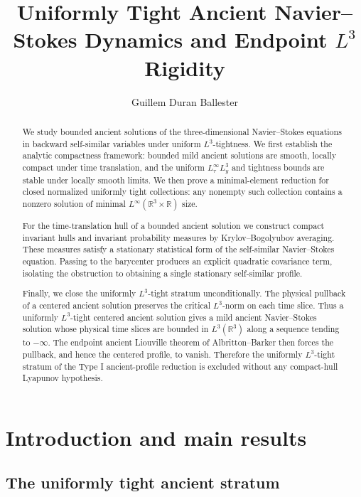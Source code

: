 \documentclass[11pt]{amsart}
\title[Uniformly tight ancient dynamics]
{Uniformly Tight Ancient Navier--Stokes Dynamics and Endpoint \(L^3\) Rigidity}
\author{Guillem Duran Ballester}
\date{}
\theoremstyle{plain}
\theoremstyle{definition}
\theoremstyle{remark}
\numberwithin{equation}{section}
\newcommand{\R}{\mathbb R}
\begin{document}
\begin{abstract}
We study bounded ancient solutions of the three-dimensional Navier--Stokes
equations in backward self-similar variables under uniform \(L^3\)-tightness.
We first establish the analytic compactness framework: bounded mild ancient
solutions are smooth, locally compact under time translation, and the
uniform \(L^\infty_\tau L^3_y\) and tightness bounds are stable under locally
smooth limits.  We then prove a minimal-element reduction for closed normalized
uniformly tight collections: any nonempty such collection contains a nonzero
solution of minimal \(L^\infty(\R^3\times\R)\) size.

For the time-translation hull of a bounded ancient solution we construct compact
invariant hulls and invariant probability measures by Krylov--Bogolyubov
averaging.  These measures satisfy a stationary statistical form of the
self-similar Navier--Stokes equation.  Passing to the barycenter produces an
explicit quadratic covariance term, isolating the obstruction to obtaining a
single stationary self-similar profile.

Finally, we close the uniformly \(L^3\)-tight stratum unconditionally.  The
physical pullback of a centered ancient solution preserves the critical
\(L^3\)-norm on each time slice.  Thus a uniformly \(L^3\)-tight centered
ancient solution gives a mild ancient Navier--Stokes solution whose physical
time slices are bounded in \(L^3(\R^3)\) along a sequence tending to
\(-\infty\).  The endpoint ancient Liouville theorem of
Albritton--Barker then forces the pullback, and hence the centered profile, to
vanish.  Therefore the uniformly \(L^3\)-tight stratum of the Type I
ancient-profile reduction is excluded without any compact-hull Lyapunov
hypothesis.
\end{abstract}

\maketitle

\section{Introduction and main results}\label{sec:introduction}

\subsection{The uniformly tight ancient stratum}
\end{document}
